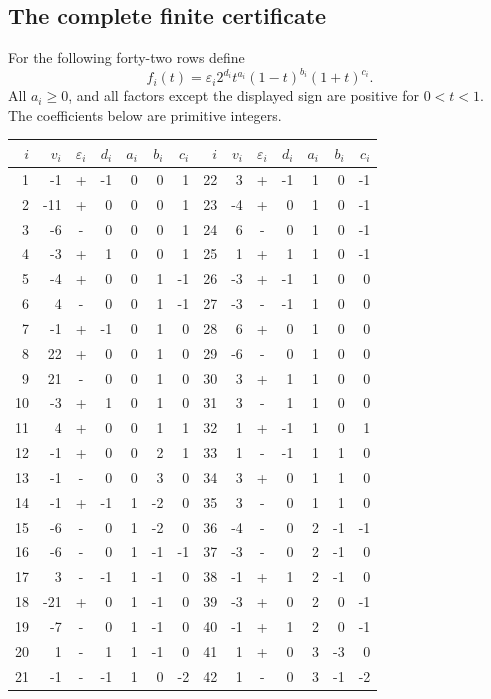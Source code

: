 \subsection{The complete finite certificate}

For the following forty-two rows define
\begin{equation}
 f_i(t)=\varepsilon_i2^{d_i}t^{a_i}(1-t)^{b_i}(1+t)^{c_i}.
\label{rattetra:eq:arguments}
\end{equation}
All $a_i\ge0$, and all factors except the displayed sign are positive
for $0<t<1$. The coefficients below are primitive integers.

\begin{center}\small
\setlength{\tabcolsep}{4pt}
\begin{tabular}{r r c r r r r@{\qquad}r r c r r r r}
\toprule
$i$&$v_i$&$\varepsilon_i$&$d_i$&$a_i$&$b_i$&$c_i$&
$i$&$v_i$&$\varepsilon_i$&$d_i$&$a_i$&$b_i$&$c_i$\\
\midrule
1 & -1 & + & -1 & 0 & 0 & 1 & 22 & 3 & + & -1 & 1 & 0 & -1 \\
2 & -11 & + & 0 & 0 & 0 & 1 & 23 & -4 & + & 0 & 1 & 0 & -1 \\
3 & -6 & - & 0 & 0 & 0 & 1 & 24 & 6 & - & 0 & 1 & 0 & -1 \\
4 & -3 & + & 1 & 0 & 0 & 1 & 25 & 1 & + & 1 & 1 & 0 & -1 \\
5 & -4 & + & 0 & 0 & 1 & -1 & 26 & -3 & + & -1 & 1 & 0 & 0 \\
6 & 4 & - & 0 & 0 & 1 & -1 & 27 & -3 & - & -1 & 1 & 0 & 0 \\
7 & -1 & + & -1 & 0 & 1 & 0 & 28 & 6 & + & 0 & 1 & 0 & 0 \\
8 & 22 & + & 0 & 0 & 1 & 0 & 29 & -6 & - & 0 & 1 & 0 & 0 \\
9 & 21 & - & 0 & 0 & 1 & 0 & 30 & 3 & + & 1 & 1 & 0 & 0 \\
10 & -3 & + & 1 & 0 & 1 & 0 & 31 & 3 & - & 1 & 1 & 0 & 0 \\
11 & 4 & + & 0 & 0 & 1 & 1 & 32 & 1 & + & -1 & 1 & 0 & 1 \\
12 & -1 & + & 0 & 0 & 2 & 1 & 33 & 1 & - & -1 & 1 & 1 & 0 \\
13 & -1 & - & 0 & 0 & 3 & 0 & 34 & 3 & + & 0 & 1 & 1 & 0 \\
14 & -1 & + & -1 & 1 & -2 & 0 & 35 & 3 & - & 0 & 1 & 1 & 0 \\
15 & -6 & - & 0 & 1 & -2 & 0 & 36 & -4 & - & 0 & 2 & -1 & -1 \\
16 & -6 & - & 0 & 1 & -1 & -1 & 37 & -3 & - & 0 & 2 & -1 & 0 \\
17 & 3 & - & -1 & 1 & -1 & 0 & 38 & -1 & + & 1 & 2 & -1 & 0 \\
18 & -21 & + & 0 & 1 & -1 & 0 & 39 & -3 & + & 0 & 2 & 0 & -1 \\
19 & -7 & - & 0 & 1 & -1 & 0 & 40 & -1 & + & 1 & 2 & 0 & -1 \\
20 & 1 & - & 1 & 1 & -1 & 0 & 41 & 1 & + & 0 & 3 & -3 & 0 \\
21 & -1 & - & -1 & 1 & 0 & -2 & 42 & 1 & - & 0 & 3 & -1 & -2 \\
\bottomrule
\end{tabular}
\end{center}

